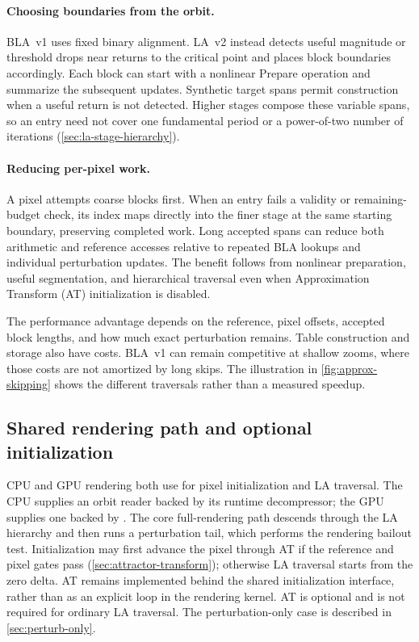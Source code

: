 \paragraph{Choosing boundaries from the orbit.}
BLA~v1 uses fixed binary alignment. LA~v2 instead detects useful
magnitude or threshold drops near returns to the critical point and
places block boundaries accordingly. Each block can start with a
nonlinear Prepare operation and summarize the subsequent updates.
Synthetic target spans permit construction when a useful return is
not detected. Higher stages compose these variable spans, so an
entry need not cover one fundamental period or a power-of-two number
of iterations (\cref{sec:la-stage-hierarchy}).

\paragraph{Reducing per-pixel work.}
A pixel attempts coarse blocks first. When an entry fails a validity
or remaining-budget check, its index maps directly into the finer
stage at the same starting boundary, preserving completed work.
Long accepted spans can reduce both arithmetic and reference accesses
relative to repeated BLA lookups and individual perturbation updates.
The benefit follows from nonlinear preparation, useful segmentation,
and hierarchical traversal even when Approximation Transform (AT)
initialization is disabled.

The performance advantage depends on the reference, pixel offsets,
accepted block lengths, and how much exact perturbation remains.
Table construction and storage also have costs. BLA~v1 can remain
competitive at shallow zooms, where those costs are not amortized
by long skips. The illustration in \cref{fig:approx-skipping} shows
the different traversals rather than a measured speedup.

\subsection{Shared rendering path and optional initialization}
CPU and GPU rendering both use
 for pixel initialization
and LA traversal. The CPU supplies an orbit reader backed by its
runtime decompressor; the GPU supplies one backed by
. The core full-rendering path descends
through the LA hierarchy and then runs a perturbation tail, which
performs the rendering bailout test. Initialization may first advance
the pixel through AT if the reference and pixel gates pass
(\cref{sec:attractor-transform}); otherwise LA traversal starts from
the zero delta. AT remains implemented behind the shared initialization
interface, rather than as an explicit loop in the rendering kernel.
AT is optional and is not required for ordinary LA traversal.
The perturbation-only case is described in \cref{sec:perturb-only}.

